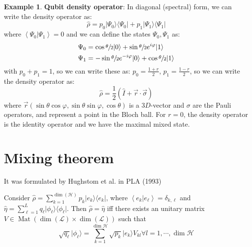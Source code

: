\documentclass[12pt]{book}
\theoremstyle{definition}
\newtheorem*{example}{\bfseries Example}
\renewcommand{\v}[1]{\vec{#1}}
\newcommand{\de}{\delta}
\newcommand{\p}{\varphi}
\newcommand{\scalar}[1]{\left\langle {#1}\right\rangle}
\let\oldsum\sum
\renewcommand{\sum}[2]{\oldsum\limits_{#1}^{#2}}
\newcommand{\si}{\sigma}
\newcommand{\para}[1]{\left( {#1} \right)}
\newcommand{\bra}[1]{\langle {#1} \vert}
\newcommand{\ket}[1]{\vert {#1} \rangle}
\DeclareMathOperator{\mat}{Mat}
\begin{document}
\begin{example}
\textbf{Qubit density operator}: In diagonal (spectral) form, we can write the density operator as:
\begin{equation*}
  \hat \rho = p_0 \ket{\Psi_0}\bra{\Psi_0} + p_1 \ket{\Psi_1}\bra{\Psi_1}
\end{equation*}
where $\scalar{\Psi_0\vert\Psi_1} = 0$ and we can define the states $\Psi_0, \Psi_1$ as:
\begin{align*}
 \Psi_0 & = \cos\sfrac\theta 2 \ket{0} + \sin \sfrac\theta 2 e^{i\p} \ket{1} \\
 \Psi_1 & = - \sin \sfrac\theta 2 e^{-i\p}\ket{0} + \cos \sfrac\theta 2 \ket{1}
\end{align*}
with $p_0 + p_1 = 1$, so we can write these as: $p_0 = \frac{1 + r}{2}$, $p_1 = \frac{1 - r}{2}$, so we can write the density operator as:
\begin{equation}
  \hat \rho = \frac{1}{2} \para{\hat I + \v r \cdot \v \si}
\end{equation}
where $\v r(\sin\theta \cos\p, \sin\theta \sin\p, \cos\theta)$ is a $3D$-vector and $\si$ are the Pauli operators, and represent a point in the Bloch ball. For $r = 0$, the density operator is the identity operator and we have the maximal mixed state.
\end{example}

\section{Mixing theorem}
It was formulated by Hughstom et al. in PLA (1993)
\begin{tcolorbox}
  Consider $\hat \rho = \sum{k=1}{\dim(\mathcal H)} p_k \ket{e_k}\bra{e_k}$, where $\scalar{e_k \vert e_\ell} = \de_{k, \ell}$ and $\hat \eta = \sum{\ell = 1}{L} q_\ell \ket{\phi_\ell}\bra{\phi_\ell}$.
  Then $\hat \rho = \hat \eta$ iff there exists an unitary matrix $V \in \mat(\dim (\mathcal L) \times \dim(\mathcal L))$ such that
  \begin{equation}
  \sqrt{q_\ell} \ket{\phi_\ell} = \sum{k=1}{\dim \mathcal H} \sqrt{p_k} \ket{e_k} V_{kl} \forall l = 1, \cdots, \dim \mathcal H
  \end{equation}
\end{tcolorbox}
\end{document}
